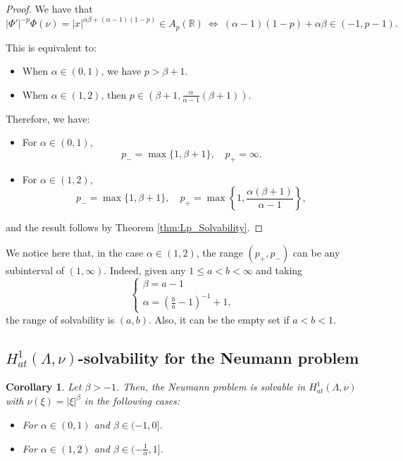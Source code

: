 \documentclass[12pt]{amsart}
\newcommand{\R}{\mathbb{R}}
\theoremstyle{plain}
\newtheorem{corollary}[theorem]{Corollary}
\theoremstyle{definition}
\numberwithin{equation}{section}
\begin{document}
\begin{proof}
We have that
\[
|\Phi'|^{-p}\Phi(\nu)
=
|x|^{\alpha\beta+(\alpha-1)(1-p)}
\in 
A_p(\R)\ \iff\  (\alpha-1)(1-p)+\alpha\beta\in (-1,p-1).
\]

This is equivalent to:
\begin{itemize}
    \item When $\alpha\in (0,1)$, we have $p>\beta+1$.
    \item When $\alpha\in (1,2)$, then $p\in \left(\beta+1,\frac{\alpha}{\alpha-1}(\beta+1)\right)$.
\end{itemize}
Therefore, we have:
\begin{itemize}
    \item For $\alpha\in (0,1)$, 
    \[
    p_{-}=\max\{1,\beta+1\},\quad p_{+}=\infty.
    \]
    \item For $\alpha\in (1,2)$,
    \[
    p_{-}
    =
    \max\{1,\beta+1\}, \quad   p_{+}
    =
    \max\left\{1,\frac{\alpha(\beta+1)}{\alpha-1}\right\},
    \]

\end{itemize}
   and the result follows by Theorem \ref{thm:Lp_Solvability}.
\end{proof}

We notice here  that, in the case $\alpha\in (1,2)$, the range $(p_{+},p_{-})$ can be any subinterval of $(1,\infty)$. Indeed, given any $1\leq a<b<\infty$ and taking 
\[
\begin{cases}
    \beta=a-1\\
    \alpha=\left(\frac{b}{a}-1\right)^{-1}+1,
\end{cases}
\]
the range of solvability is $(a,b)$. Also, it can be the empty set if $a<b<1$.
















\subsection{\texorpdfstring{$H_{at}^{1}(\Lambda,\nu)$}{}-solvability for the Neumann problem}\label{section:examplesH1}

\begin{corollary}\label{corol:exampleH1}
Let $\beta>-1$. Then, the Neumann problem is solvable in $H_{at}^{1}(\Lambda, \nu)$ with $\nu(\xi)=|\xi|^{\beta}$  in the following cases: 
\begin{itemize}
    \item For $\alpha\in (0,1)$ and $\beta\in (-1,0]$.
    \item For $\alpha\in (1,2)$ and $\beta\in (-\frac{1}{\alpha},1]$.
\end{itemize}
\end{corollary}
\end{document}
